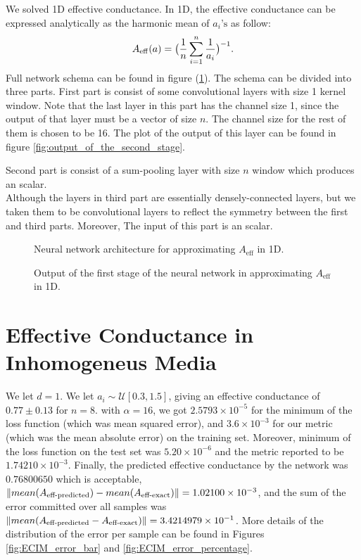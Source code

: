 \pagebreak
We solved 1D effective conductance. In 1D, the effective conductance can be expressed analytically as the harmonic mean of $a_i\text{'s}$ as follow:
\begin{equation}
\label{ECIM_AnalythicalSolution}
A_{\operatorname{eff}}(a) = \big( \frac{1}{n} \sum_{i=1}^{n} \frac{1}{a_i}\big) ^{-1}.
\end{equation}
Full network schema can be found in figure (\ref{fig:ECIM_NN_Structure}). The schema can be divided into three parts. First part is consist of some convolutional layers with size 1 kernel window. Note that the last layer in this part has the channel size 1, since the output of that layer must be a vector of size $n$. The channel size for the rest of them is chosen to be 16. %
The plot of the output of this layer can be found in figure \eqref{fig:output_of_the_second_stage}.

Second part is consist of a sum-pooling layer with size $n$ window which produces an scalar.\\
Although the layers in third part are essentially densely-connected layers, but we taken them to be convolutional layers to reflect the symmetry between the first and third parts. Moreover, The input of this part is an scalar.
\begin{figure}[h!]
	{
	\centering
	\def\svgwidth{\columnwidth}
	\scalebox{.5}{}
	\caption{Neural network architecture for approximating $A_\text{eff}$ in 1D.}
	\label{fig:ECIM_NN_Structure}
	}
\end{figure}
\begin{figure}[h!]
	{
	\centering
	\def\svgwidth{\columnwidth}
	\scalebox{.5}{}
	\caption{Output of the first stage of the neural network in approximating $A_\text{eff}$ in 1D.}
	\label{fig:output_of_the_second_stage}
	}
\end{figure}
\pagebreak
\section{Effective Conductance in Inhomogeneus Media}
We let $d=1$. We let $a_i \sim \mathscr{U} [ 0.3, 1.5 ]$, giving an effective conductance of $0.77 \pm 0.13$ for $n = 8$. with $\alpha = 16$, we got $2.5793 \times 10^{-5}$ for the minimum of the loss function (which was mean squared error), and $3.6 \times 10^{-3}$ for our metric (which was the mean absolute error) on the training set. Moreover, minimum of the loss function on the test set was $5.20 \times 10^{-6}$ and the metric reported to be $1.74210 \times 10 ^ {-3}$. Finally, the predicted effective conductance by the network was $0.76800650$ which is acceptable, $\left\lVert mean(A_{\text{eff-predicted}}) - mean(A_{\text{eff-exact}})\right\rVert = 1.02100 \times 10^{-3}$, and the sum of the error committed over all samples was $\left\lVert mean(A_{\text{eff-predicted}} -A_{\text{eff-exact}})\right\rVert = 3.4214979 \times 10^{-1}$. More details of the distribution of the error per sample can be found in Figures \eqref{fig:ECIM_error_bar} and \eqref{fig:ECIM_error_percentage}.

